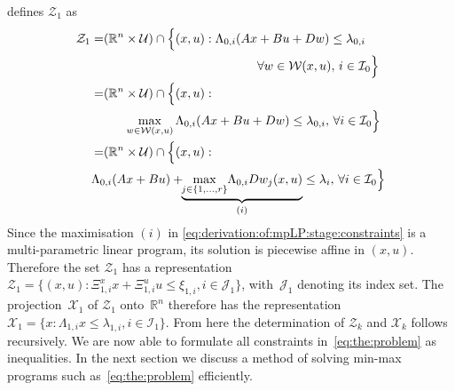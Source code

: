 \documentclass{ifacconf}
\begin{document}
defines $\mathcal Z_1$ as
\begin{equation}\label{eq:derivation:of:mpLP:stage:constraints}
\begin{aligned}
	\mathcal Z_1 =& (\mathbb R^n\times\mathcal U)\cap 
\begin{aligned}[t] \Bigl\{(x,u): \Lambda_{0,i}(Ax&+Bu+Dw)\leq \lambda_{0,i} \\
& \forall w\in\mathcal W(x,u),\, i\in\mathcal I_0 \Bigr\} \end{aligned}
\\
	=&\begin{aligned}[t] (\mathbb R^n & \times \mathcal U) \cap\Bigl\{ (x,u): \\
& \max_{w\in\mathcal W(x,u)}\Lambda_{0,i}(Ax+Bu+Dw)\leq\lambda_{0,i},\, \forall i\in\mathcal I_0 \Bigr\} \end{aligned}
\\
	=&\begin{aligned}[t] & (\mathbb R^n \times\mathcal U)\cap \Bigl\{ (x,u): \\
& \!\!\!\!\!\!
\Lambda_{0,i}(Ax+Bu)+ \!\!\underbrace{\max_{j\in\{1,\dots,r\}}\!\Lambda_{0,i} Dw_j(x,u)}_{(i)}\leq\lambda_i, \, \forall i\in\mathcal I_0
	\Bigr\} \end{aligned}
\end{aligned}
\end{equation}
Since the maximisation $(i)$ in \eqref{eq:derivation:of:mpLP:stage:constraints} is a multi-parametric
linear program, its solution is piecewise affine in $(x,u)$. 
Therefore the set $\mathcal Z_1$ has a representation
$\mathcal Z_1=\{(x,u):\Xi^x_{1,i}x+\Xi^u_{1,i}u\leq\xi_{1,i},i\in\mathcal J_1\}$, with~$\mathcal J_1$ denoting
its index set. The projection~$\mathcal X_1$ 
of $\mathcal Z_1$ onto~$\mathbb R^n$ therefore has the representation~$\mathcal X_1 = \{x:\Lambda_{1,i} x\leq\lambda_{1,i},i\in\mathcal I_1\}$.
From here the determination of $\mathcal Z_k$ and $\mathcal X_k$ follows recursively. We are now able to formulate 
all constraints in~\eqref{eq:the:problem} as inequalities. In the next section we discuss a method of solving
min-max programs such as~\eqref{eq:the:problem} efficiently.
\end{document}
